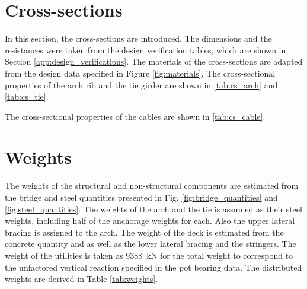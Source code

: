 \section{Cross-sections} \label{app:cross_sections}
In this section, the cross-sections are introduced. The dimensions and the resistances were taken from the design verification tables, which are shown in Section \ref{app:design_verifications}. The materials of the cross-sections are adapted from the design data specified in Figure \ref{fig:materials}.
The cross-sectional properties of the arch rib and the tie girder are shown in \cref{tab:cs_arch} and \cref{tab:cs_tie}.




\newpage
The cross-sectional properties of the cables are shown in \cref{tab:cs_cable}.



\section{Weights} \label{app:weight}
The weights of the structural and non-structural components are estimated from the bridge and steel quantities presented in Fig. \ref{fig:bridge_quantities} and \ref{fig:steel_quantities}. The weights of the arch and the tie is assumed as their steel weights, including half of the anchorage weights for each. Also the upper lateral bracing is assigned to the arch. The weight of the deck is estimated from the concrete quantity and as well as the lower lateral bracing and the stringers. The weight of the utilities is taken as \SI{9388}{kN} for the total weight to correspond to the unfactored vertical reaction specified in the pot bearing data. The distributed weights are derived in Table  \ref{tab:weights}.

